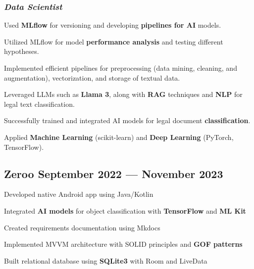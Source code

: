 \documentclass[a4paper,12pt]{article}
\begin{document}
\subsubsection*{\normalsize \textit{Data Scientist}}
\vspace{-1em}
\vspace{-0.5em}
\begin{zitemize}

  \item Used \textbf{MLflow} for versioning and developing \textbf{pipelines for AI} models.  
  \item Utilized MLflow for model \textbf{performance analysis} and testing different hypotheses.  
  \item Implemented efficient pipelines for preprocessing (data mining, cleaning, and augmentation), vectorization, and storage of textual data.  
  \item Leveraged LLMs such as \textbf{Llama 3}, along with \textbf{RAG} techniques and \textbf{NLP} for legal text classification.  
  \item Successfully trained and integrated AI models for legal document \textbf{classification}.  
  \item Applied \textbf{Machine Learning} (scikit-learn) and \textbf{Deep Learning} (PyTorch, TensorFlow).  
\end{zitemize}

\vspace{1.5em}
\vspace*{7pt}
\vspace{1.5em}

\subsection*{\large Zeroo \hfill September 2022 --- November 2023}

\vspace{-0.5em}
\begin{zitemize}
    \item Developed native Android app using Java/Kotlin
    \item Integrated \textbf{AI models} for object classification with \textbf{TensorFlow} and \textbf{ML Kit}
    \item Created requirements documentation using Mkdocs
    \item Implemented MVVM architecture with SOLID principles and \textbf{GOF patterns}
    \item Built relational database using \textbf{SQLite3} with Room and LiveData
\end{zitemize}
\end{document}
